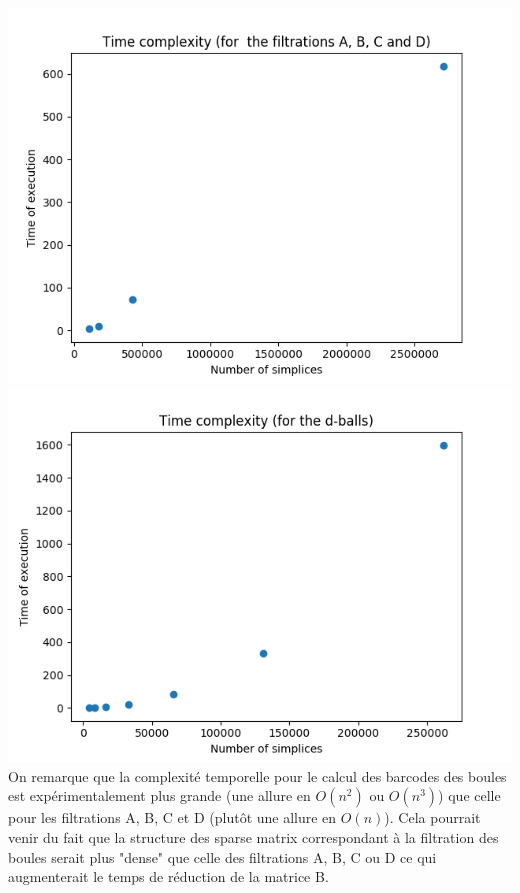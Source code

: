 \documentclass[a4paper,11pt]{article}
\begin{document}
\includegraphics[width=15cm]{"Fig1a"}\\

\includegraphics[width=15cm]{"Fig1b"}\\

On remarque que la complexité temporelle pour le calcul des barcodes des boules est expérimentalement plus grande (une allure en $O(n^2)$ ou $O(n^3)$) que celle pour les filtrations A, B, C et D (plutôt une allure en $O(n)$). Cela pourrait venir du fait que la structure des sparse matrix correspondant à la filtration des boules serait plus "dense" que celle des filtrations A, B, C ou D ce qui augmenterait le temps de réduction de la matrice B.
\end{document}

